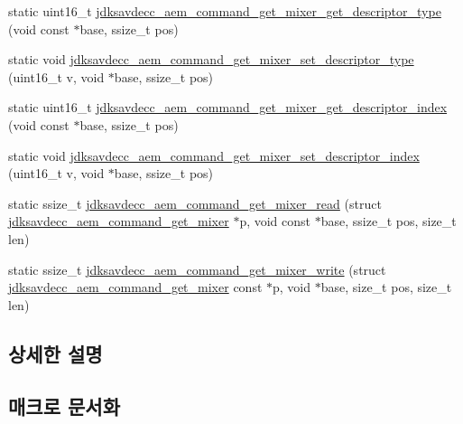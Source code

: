 \begin{DoxyCompactItemize}
static uint16\+\_\+t \hyperlink{group__command__get__mixer_ga78a91c078980c39650c6d42d8f332793}{jdksavdecc\+\_\+aem\+\_\+command\+\_\+get\+\_\+mixer\+\_\+get\+\_\+descriptor\+\_\+type} (void const $\ast$base, ssize\+\_\+t pos)
\item 
static void \hyperlink{group__command__get__mixer_ga0fdafa7972c85c0a695f9efde2dfbfb1}{jdksavdecc\+\_\+aem\+\_\+command\+\_\+get\+\_\+mixer\+\_\+set\+\_\+descriptor\+\_\+type} (uint16\+\_\+t v, void $\ast$base, ssize\+\_\+t pos)
\item 
static uint16\+\_\+t \hyperlink{group__command__get__mixer_ga92f6563898a4ca71092ee8e18673300c}{jdksavdecc\+\_\+aem\+\_\+command\+\_\+get\+\_\+mixer\+\_\+get\+\_\+descriptor\+\_\+index} (void const $\ast$base, ssize\+\_\+t pos)
\item 
static void \hyperlink{group__command__get__mixer_gaf94f7b62e48ccf2366c79231b331cdc3}{jdksavdecc\+\_\+aem\+\_\+command\+\_\+get\+\_\+mixer\+\_\+set\+\_\+descriptor\+\_\+index} (uint16\+\_\+t v, void $\ast$base, ssize\+\_\+t pos)
\item 
static ssize\+\_\+t \hyperlink{group__command__get__mixer_gaadf921db77a50a29dcb2c437b93e6d5e}{jdksavdecc\+\_\+aem\+\_\+command\+\_\+get\+\_\+mixer\+\_\+read} (struct \hyperlink{structjdksavdecc__aem__command__get__mixer}{jdksavdecc\+\_\+aem\+\_\+command\+\_\+get\+\_\+mixer} $\ast$p, void const $\ast$base, ssize\+\_\+t pos, size\+\_\+t len)
\item 
static ssize\+\_\+t \hyperlink{group__command__get__mixer_gad33e55c190c932fada5f05a16a8c39cd}{jdksavdecc\+\_\+aem\+\_\+command\+\_\+get\+\_\+mixer\+\_\+write} (struct \hyperlink{structjdksavdecc__aem__command__get__mixer}{jdksavdecc\+\_\+aem\+\_\+command\+\_\+get\+\_\+mixer} const $\ast$p, void $\ast$base, size\+\_\+t pos, size\+\_\+t len)
\end{DoxyCompactItemize}


\subsection{상세한 설명}


\subsection{매크로 문서화}
